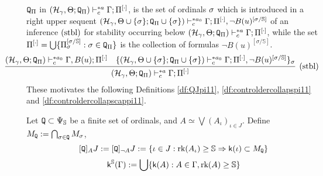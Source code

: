 \documentclass{article}
\newcommand{\mS}{\mathbb{S}}
\begin{document}
${\tt Q}_{\Pi}$ in $(\mathcal{H}_{\gamma},\Theta;{\tt Q}_{\Pi})\vdash^{* a}_{c}\Gamma;\Pi^{[\cdot]}$, is the set of ordinals $\sigma$ which is introduced in a right upper sequent 
$(\mathcal{H}_{\gamma},\Theta\cup\{\sigma\};{\tt Q}_{\Pi}\cup\{\sigma\}
)
\vdash^{* a_{0}}_{c}
\Gamma;\Pi^{[\cdot]}, \lnot B(u)^{[\sigma/\mathbb{S}]}$
of an inference $({\rm stbl})$
for stability occurring below $(\mathcal{H}_{\gamma},\Theta;{\tt Q}_{\Pi})\vdash^{* a}_{c}\Gamma;\Pi^{[\cdot]}$, while the set $\Pi^{[\cdot]}=\bigcup\{\Pi_{\sig}^{[\sig/\mS]}:\sig\in {\tt Q}_{\Pi}\}$
is the collection of formulas $\lnot B(u)^{[\sigma/\mathbb{S}]}$.
{\small
\[
\hspace{-10mm}
\infer[({\rm stbl})]{(\mathcal{H}_{\gamma},\Theta;{\tt Q}_{\Pi}
)
\vdash^{* a}_{c}
\Gamma;\Pi^{[\cdot]}}
{
(\mathcal{H}_{\gamma},\Theta;{\tt Q}_{\Pi}
)\vdash^{* a_{0}}_{c}
\Gamma, B(u);\Pi^{[\cdot]}
&
\{
(\mathcal{H}_{\gamma},\Theta\cup\{\sig\};{\tt Q}_{\Pi}\cup\{\sig\}
)
\vdash^{* a_{0}}_{c}
\Gamma;\Pi^{[\cdot]}, \lnot B(u)^{[\sigma/\mathbb{S}]}
\}_{\sig}
}
\]
}
These motivates the following Definitions \ref{df:QJpi11}, \ref{df:controldercollapspi11} and \ref{df:controldercollapscappi11}.

\bdf\label{df:QJpi11}
{\rm
Let ${\tt Q}\subset\Psi_{\mS}$ be a finite set of ordinals, and $A\simeq\bigvee(A_{\iota})_{\iota\in J}$.
Define $M_{{\tt Q}} :=  \bigcap_{\sigma\in{\tt Q}} M_{\sigma}$,
\[
[{\tt Q}]_{A}J  := [{\tt Q}]_{\lnot A}J :=  
\{\iota\in J: \rk(A_{\iota})\geq\mS \Rarw \sfk(\iota)\subset M_{{\tt Q}}\} 
\]
\[
\sfk^{\mS}(\Gam)   :=   \bigcup\{\sfk(A): A\in\Gam, \rk(A)\geq\mS\}
\]

}
\edf
\end{document}

